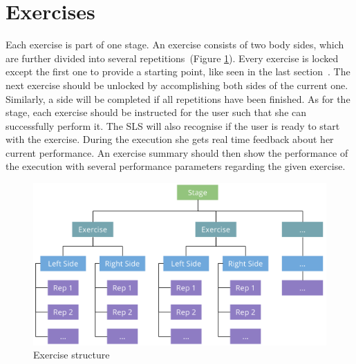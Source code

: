 \section{Exercises}\label{4_4_exercises}
Each exercise is part of one stage. An exercise consists of two body sides, which are further divided into several repetitions~(Figure \ref{fig:exerciseStructure}). Every exercise is locked except the first one to provide a starting point, like seen in the last section~. The next exercise should be unlocked by accomplishing both sides of the current one. Similarly, a side will be completed if all repetitions have been finished. As for the stage, each exercise should be instructed for the user such that she can successfully perform it. The SLS will also recognise if the user is ready to start with the exercise. During the execution she gets real time feedback about her current performance. An exercise summary should then show the performance of the execution with several performance parameters regarding the given exercise.
\begin{figure}[htb]
	\centering
	\begin{minipage}[t]{1\linewidth}
		\centering
		\includegraphics[width=1\linewidth]{Pictures/exerciseStructureTopDown2}
		\caption{Exercise structure}
		\label{fig:exerciseStructure}
	\end{minipage}
\end{figure}

